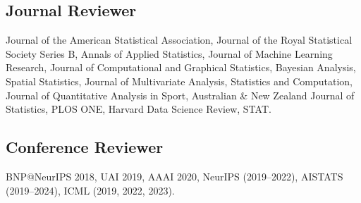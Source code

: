 \documentclass[10pt]{article}
\begin{document}
\subsection*{Journal Reviewer} Journal of the American Statistical Association, Journal of the Royal Statistical Society Series B, Annals of Applied Statistics, Journal of Machine Learning Research, Journal of Computational and Graphical Statistics, Bayesian Analysis, Spatial Statistics, Journal of Multivariate Analysis, Statistics and Computation, Journal of Quantitative Analysis in Sport, Australian \& New Zealand Journal of Statistics, PLOS ONE, Harvard Data Science Review, STAT. 

\subsection*{Conference Reviewer} BNP@NeurIPS 2018, UAI 2019, AAAI 2020,  NeurIPS (2019--2022), AISTATS (2019--2024), ICML (2019, 2022, 2023).
\end{document}
